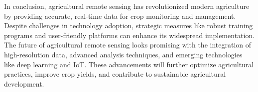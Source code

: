 \documentclass[conference]{IEEEtran}
\begin{document}
In conclusion, agricultural remote sensing has revolutionized modern agriculture by providing accurate, real-time data for crop monitoring and management. Despite challenges in technology adoption, strategic measures like robust training programs and user-friendly platforms can enhance its widespread implementation. The future of agricultural remote sensing looks promising with the integration of high-resolution data, advanced analysis techniques, and emerging technologies like deep learning and IoT. These advancements will further optimize agricultural practices, improve crop yields, and contribute to sustainable agricultural development.






\end{document}
